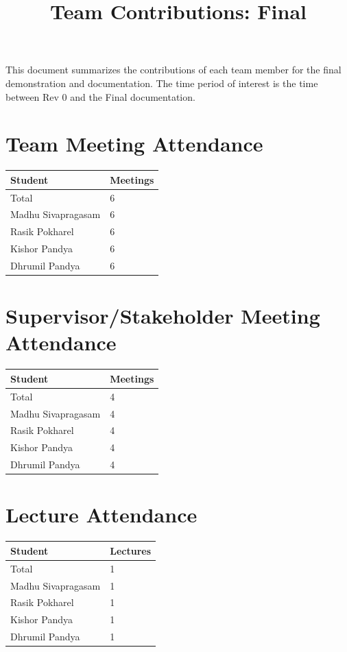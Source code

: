 \documentclass{article}
\title{Team Contributions: Final\\\progname}
\author{\authname}
\date{}
\begin{document}
\maketitle

This document summarizes the contributions of each team member for the final
demonstration and documentation.  The time period of interest is the time
between Rev 0 and the Final documentation.

\section{Team Meeting Attendance}


\begin{table}[H]
\centering
\begin{tabular}{ll}
\toprule
\textbf{Student} & \textbf{Meetings}\\
\midrule
Total & 6\\
Madhu Sivapragasam & 6\\
Rasik Pokharel & 6\\
Kishor Pandya & 6\\
Dhrumil Pandya & 6\\
\bottomrule
\end{tabular}
\end{table}

\section{Supervisor/Stakeholder Meeting Attendance}


\begin{table}[H]
\centering
\begin{tabular}{ll}
\toprule
\textbf{Student} & \textbf{Meetings}\\
\midrule
Total & 4\\
Madhu Sivapragasam & 4\\
Rasik Pokharel & 4\\
Kishor Pandya & 4\\
Dhrumil Pandya & 4\\
\bottomrule
\end{tabular}
\end{table}


\section{Lecture Attendance}

\begin{table}[H]
\centering
\begin{tabular}{ll}
\toprule
\textbf{Student} & \textbf{Lectures}\\
\midrule
Total & 1\\
Madhu Sivapragasam & 1\\
Rasik Pokharel & 1\\
Kishor Pandya & 1\\
Dhrumil Pandya & 1\\
\bottomrule
\end{tabular}
\end{table}
\end{document}
